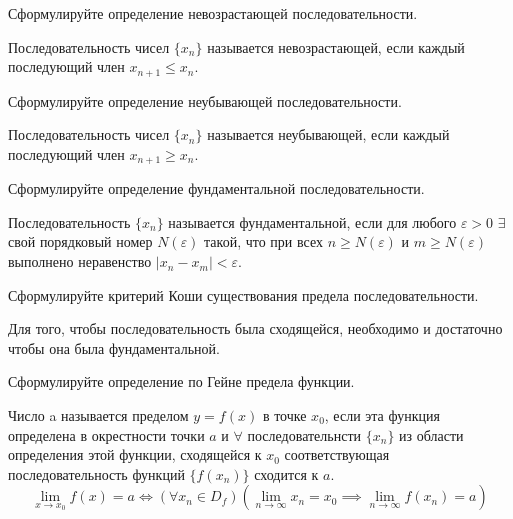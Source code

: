 \begin{question}
  Сформулируйте определение невозрастающей последовательности.
\end{question}
\begin{answer}
  Последовательность чисел $\{x_{n}\}$ называется невозрастающей, если каждый последующий член $x_{n+1} \le x_{n}$.
\end{answer}

\begin{question}
  Сформулируйте определение неубывающей последовательности.
\end{question}
\begin{answer}
  Последовательность чисел $\{x_{n}\}$ называется неубывающей, если каждый последующий член $x_{n+1} \ge x_{n}$.
\end{answer}

\begin{question}
  Сформулируйте определение фундаментальной последовательности.
\end{question}
\begin{answer}
  Последовательность $\{x_{n}\}$ называется фундаментальной, если для любого $\varepsilon > 0$ $\exists$ свой порядковый номер $N(\varepsilon)$ такой, что при всех $n \ge N(\varepsilon)$ и $m \ge N(\varepsilon)$ выполнено неравенство $|x_{n} - x_{m}| < \varepsilon$. 
\end{answer}

\begin{question}
  Сформулируйте критерий Коши существования предела последовательности.
\end{question}
\begin{answer}
  Для того, чтобы последовательность была сходящейся, необходимо и достаточно чтобы она была фундаментальной.
\end{answer}

\begin{question}
  Сформулируйте определение по Гейне предела функции.
\end{question}
\begin{answer}
  Число a называется пределом $y=f(x)$ в точке $x_0$, если эта функция определена в окрестности точки $a$ и $\forall$ последовательнсти $\{x_n\}$ из области определения этой функции, сходящейся к $x_0$ соответствующая последовательность функций $\{f(x_{n})\}$ сходится к $a$. \[
    \lim_{x \to x_0} f(x) = a \iff (\forall x_{n} \in D_f)(\lim_{n \to \infty} x_{n} = x_{0} \implies \lim_{n \to \infty} f(x_{n}) = a)
\] 
\end{answer}

